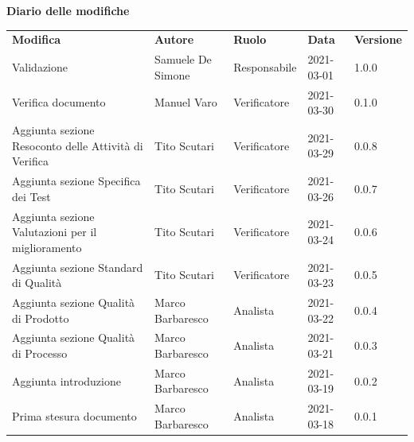 \documentclass[a4paper]{article}
\begin{document}
\begin{center}
    \textbf{\Large Diario delle modifiche}\\
    \vspace{10px}
    \begin{table}[h!]
        \centering
        \renewcommand{\arraystretch}{1.8}
        \begin{tabular}{p{150px} p{90px} p{60px} p{60px} p{45px}}
            \rowcolor{logo!70} \textbf{Modifica}                  & \textbf{Autore}   & \textbf{Ruolo} & \textbf{Data} & \textbf{Versione} \\
            Validazione                                           & Samuele De Simone & Responsabile   & 2021-03-01    & 1.0.0             \\
            Verifica documento                                    & Manuel Varo       & Verificatore   & 2021-03-30    & 0.1.0             \\
            Aggiunta sezione Resoconto delle Attività di Verifica & Tito Scutari      & Verificatore   & 2021-03-29    & 0.0.8             \\
            Aggiunta sezione Specifica dei Test                   & Tito Scutari      & Verificatore   & 2021-03-26    & 0.0.7             \\
            Aggiunta sezione Valutazioni per il miglioramento     & Tito Scutari      & Verificatore   & 2021-03-24    & 0.0.6             \\
            Aggiunta sezione Standard di Qualità                  & Tito Scutari      & Verificatore   & 2021-03-23    & 0.0.5             \\
            Aggiunta sezione Qualità di Prodotto                  & Marco Barbaresco  & Analista       & 2021-03-22    & 0.0.4             \\
            Aggiunta sezione Qualità di Processo                  & Marco Barbaresco  & Analista       & 2021-03-21    & 0.0.3             \\
            Aggiunta introduzione                                 & Marco Barbaresco  & Analista       & 2021-03-19    & 0.0.2             \\
            Prima stesura documento                               & Marco Barbaresco  & Analista       & 2021-03-18    & 0.0.1             \\
        \end{tabular}
    \end{table}
\end{center}

\newpage
\tableofcontents
\newpage
\newpage
\listoftables
\newpage




\appendix



\end{document}
